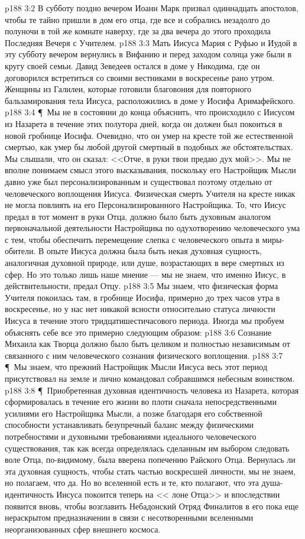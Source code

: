 \vs p188 3:2 В субботу поздно вечером Иоанн Марк призвал одиннадцать апостолов, чтобы те тайно пришли в дом его отца, где все и собрались незадолго до полуночи в той же комнате наверху, где за два вечера до этого проходила Последняя Вечеря с Учителем.
\vs p188 3:3 Мать Иисуса Мария с Руфью и Иудой в эту субботу вечером вернулись в Вифанию и перед заходом солнца уже были в кругу своей семьи. Давид Зеведеев остался в доме у Никодима, где он договорился встретиться со своими вестниками в воскресенье рано утром. Женщины из Галилеи, которые готовили благовония для повторного бальзамирования тела Иисуса, расположились в доме у Иосифа Аримафейского.
\vs p188 3:4 \P\ Мы не в состоянии до конца объяснить, что происходило с Иисусом из Назарета в течение этих полутора дней, когда он должен был покоиться в новой гробнице Иосифа. Очевидно, что он умер на кресте той же естественной смертью, как умер бы любой другой смертный в подобных же обстоятельствах. Мы слышали, что он сказал: <<Отче, в руки твои предаю дух мой>>. Мы не вполне понимаем смысл этого высказывания, поскольку его Настройщик Мысли давно уже был персонализированным и существовал поэтому отдельно от человеческого воплощения Иисуса. Физическая смерть Учителя на кресте никак не могла повлиять на его Персонализированного Настройщика. То, что Иисус предал в тот момент в руки Отца, должно было быть духовным аналогом первоначальной деятельности Настройщика по одухотворению человеческого ума с тем, чтобы обеспечить перемещение слепка с человеческого опыта в миры\hyp{}обители. В опыте Иисуса должна была быть некая духовная сущность, аналогичная духовной природе, или душе, возрастающих в вере смертных из сфер. Но это только лишь наше мнение --- мы не знаем, что именно Иисус, в действительности, предал Отцу.
\vs p188 3:5 Мы знаем, что физическая форма Учителя покоилась там, в гробнице Иосифа, примерно до трех часов утра в воскресенье, но у нас нет никакой ясности относительно статуса личности Иисуса в течение этого тридцатишестичасового периода. Иногда мы пробуем объяснять себе все это примерно следующим образом:
\vs p188 3:6 \bibnobreakspace Сознание Михаила как Творца должно было быть целиком и полностью независимым от связанного с ним человеческого сознания физического воплощения.
\vs p188 3:7 \P\ \bibnobreakspace Мы знаем, что прежний Настройщик Мысли Иисуса весь этот период присутствовал на земле и лично командовал собравшимся небесным воинством.
\vs p188 3:8 \P\ \bibnobreakspace Приобретенная духовная идентичность человека из Назарета, которая сформировалась в течение его жизни во плоти сначала непосредственными усилиями его Настройщика Мысли, а позже благодаря его собственной способности устанавливать безупречный баланс между физическими потребностями и духовными требованиями идеального человеческого существования, так как всегда определялась сделанным им выбором следовать воле Отца, по\hyp{}видимому, была вверена попечению Райского Отца. Вернулась ли эта духовная сущность, чтобы стать частью воскресшей личности, мы не знаем, но полагаем, что да. Но во вселенной есть и те, кто полагают, что эта душа\hyp{}идентичность Иисуса покоится теперь на << лоне Отца>> и впоследствии появится вновь, чтобы возглавить Небадонский Отряд Финалитов в его пока еще нераскрытом предназначении в связи с несотворенными вселенными неорганизованных сфер внешнего космоса.
